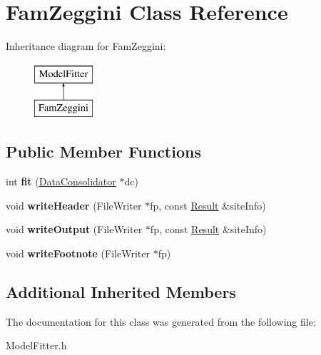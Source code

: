 \hypertarget{classFamZeggini}{\section{Fam\-Zeggini Class Reference}
\label{classFamZeggini}
}
Inheritance diagram for Fam\-Zeggini\-:\begin{figure}[H]
\begin{center}
\leavevmode
\includegraphics[height=2.000000cm]{classFamZeggini}
\end{center}
\end{figure}
\subsection*{Public Member Functions}
\begin{DoxyCompactItemize}
\item 
\hypertarget{classFamZeggini_a4f0fbfa487090e49b64a12eba230a6e9}{int {\bfseries fit} (\hyperlink{classDataConsolidator}{Data\-Consolidator} $\ast$dc)}\label{classFamZeggini_a4f0fbfa487090e49b64a12eba230a6e9}

\item 
\hypertarget{classFamZeggini_a7c8a30983804f47b57d5ffc56a9b3c83}{void {\bfseries write\-Header} (File\-Writer $\ast$fp, const \hyperlink{classResult}{Result} \&site\-Info)}\label{classFamZeggini_a7c8a30983804f47b57d5ffc56a9b3c83}

\item 
\hypertarget{classFamZeggini_a6b4ed053d08481446ad7f6a806320d88}{void {\bfseries write\-Output} (File\-Writer $\ast$fp, const \hyperlink{classResult}{Result} \&site\-Info)}\label{classFamZeggini_a6b4ed053d08481446ad7f6a806320d88}

\item 
\hypertarget{classFamZeggini_a9158d6830c268d5117ccec85e44c8118}{void {\bfseries write\-Footnote} (File\-Writer $\ast$fp)}\label{classFamZeggini_a9158d6830c268d5117ccec85e44c8118}

\end{DoxyCompactItemize}
\subsection*{Additional Inherited Members}


The documentation for this class was generated from the following file\-:\begin{DoxyCompactItemize}
\item 
Model\-Fitter.\-h\end{DoxyCompactItemize}
